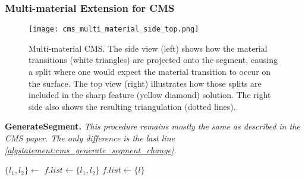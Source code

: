 \subsubsection{Multi-material Extension for CMS}
\label{sec:multi_material_cms}

\begin{figure}
\centering
\captionsetup{width=0.8\textwidth}
\texttt{[image: cms\_multi\_material\_side\_top.png]}
\caption{Multi-material CMS. The side view (left) shows how the material transitions (white triangles) are projected onto the segment, causing a split where one would expect the material transition to occur on the surface. The top view (right) illustrates how those splits are included in the sharp feature (yellow diamond) solution. The right side also shows the resulting triangulation (dotted lines).}
\label{fig:cms_multi_material}
\end{figure}

\begin{algorithm}[H]
\caption{\textbf{GenerateSegment.} \textit{This procedure remains mostly the same as described in the CMS paper. The only difference is the last line \ref{algstatement:cms_generate_segment_change}.}}\label{alg:cms_generate_segment}
\begin{algorithmic}[1]
		\State $\{l_1, l_2\} \gets $
		\State $f.list \gets \{l_1, l_2\}$
		\State {}
		\State $f.list \gets \{l\}$
		\State {}
	\EndIf
	\State {} \label{algstatement:cms_generate_segment_change}
\EndProcedure
\end{algorithmic}
\end{algorithm}

